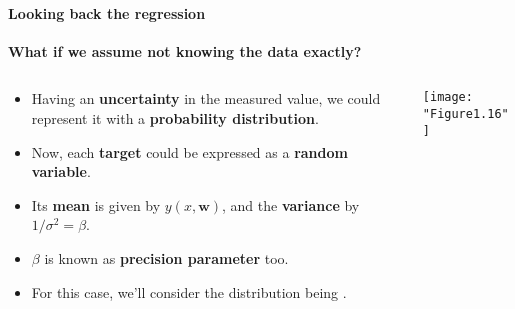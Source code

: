 \begin{frame}{\insertsubsection}
	\framesubtitle{Looking back the regression}
	\textcolor{UniGold}{\textbf{What if we assume not knowing the data exactly?}}
	\begin{columns}
	\begin{column}{0.475\textwidth}
		\begin{itemize}
			\item Having an \textcolor{UniOrange}{\textbf{uncertainty}} in the measured value, we could represent it with a \textcolor{UniOrange}{\textbf{probability distribution}}.
			\item Now, each \textcolor{UniOrange}{\textbf{target}} could be expressed as a \textcolor{UniOrange}{\textbf{random variable}}.
			\item Its \textcolor{UniOrange}{\textbf{mean}} is given by $y(x,\mathbf{w})$, and the \textcolor{UniOrange}{\textbf{variance}} by $1/\sigma^2 = \beta$.
			\item $\beta$ is known as \textcolor{UniOrange}{\textbf{precision parameter}} too.
			\item For this case, we'll consider the distribution being .
		\end{itemize}
		\end{column}
		\begin{column}{0.475\textwidth}  %
			\begin{center}
				\texttt{[image: "Figure1.16"]}
			\end{center}
		\end{column}
	\end{columns}
\end{frame}



